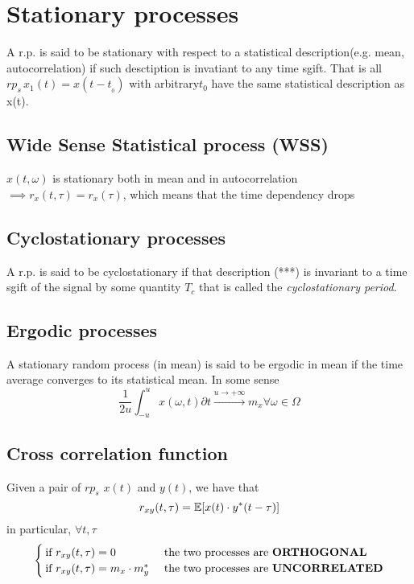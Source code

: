\section{Stationary processes}
A r.p. is said to be stationary with respect to a statistical description(e.g. mean, autocorrelation) if such desctiption is invatiant to any time sgift. That is all $rp_s \, x_1(t) = x(t-t_{_0})$ with arbitrary$t_0$ have the same statistical description as x(t).

\subsection{Wide Sense Statistical process (WSS)}
$x(t,\omega)$ is stationary both in mean and in autocorrelation $\implies r_x(t,\tau) = r_x(\tau)$, which means that the time dependency drops

\subsection{Cyclostationary processes}
A r.p. is said to be cyclostationary if that description (***) is invariant to a time sgift of the signal by some quantity $T_c$ that is called the \emph{cyclostationary period}.

\subsection{Ergodic processes}
A stationary random process (in mean) is said to be ergodic in mean if the time average converges to its statistical mean. In some sense
\begin{equation}
  \frac{1}{2 u} \int_{-u}^u x(\omega,t) \partial t \stackrel{u \to +\infty}{\rightarrow} m_x \forall \omega \in \Omega
\end{equation}

\subsection{Cross correlation function}
Given a pair of $rp_s$ $x(t)$ and $y(t)$, we have that
\begin{equation}
  r_{xy}(t,\tau) = \mathbb{E}[x(t) \cdot y^*(t-\tau)]
\end{equation}
in particular, $\forall t,\tau$
\begin{equation}
  \begin{cases}
    \text{if } r_{xy}(t,\tau)=0 & \text{ the two processes are \textbf{ORTHOGONAL}}\\
    \text{if } r_{xy}(t,\tau)=m_x \cdot m_y^* & \text{ the two processes are \textbf{UNCORRELATED}}\\

  \end{cases}
\end{equation}

